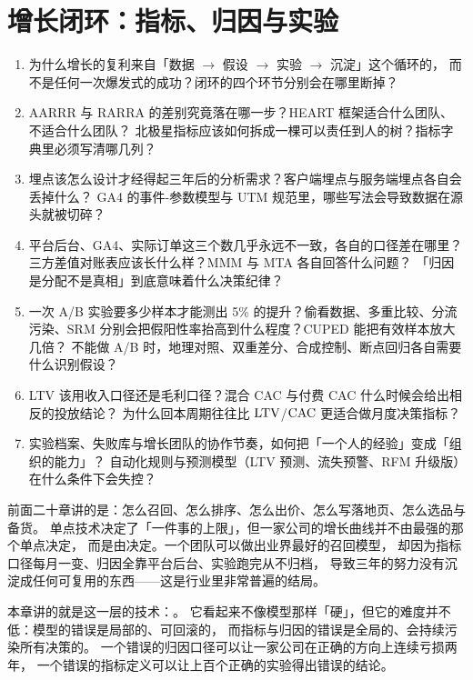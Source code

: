 \chapter{增长闭环：指标、归因与实验}
\label{ch:growth}

\begin{insight}[本章要解决的问题]
\begin{enumerate}
  \item 为什么增长的复利来自「数据 $\to$ 假设 $\to$ 实验 $\to$ 沉淀」这个循环的，
        而不是任何一次爆发式的成功？闭环的四个环节分别会在哪里断掉？
  \item AARRR 与 RARRA 的差别究竟落在哪一步？HEART 框架适合什么团队、不适合什么团队？
        北极星指标应该如何拆成一棵可以责任到人的树？指标字典里必须写清哪几列？
  \item 埋点该怎么设计才经得起三年后的分析需求？客户端埋点与服务端埋点各自会丢掉什么？
        GA4 的事件-参数模型与 UTM 规范里，哪些写法会导致数据在源头就被切碎？
  \item 平台后台、GA4、实际订单这三个数几乎永远不一致，各自的口径差在哪里？
        三方差值对账表应该长什么样？MMM 与 MTA 各自回答什么问题？
        「归因是分配不是真相」到底意味着什么决策纪律？
  \item 一次 A/B 实验要多少样本才能测出 5\% 的提升？偷看数据、多重比较、分流污染、SRM
        分别会把假阳性率抬高到什么程度？CUPED 能把有效样本放大几倍？
        不能做 A/B 时，地理对照、双重差分、合成控制、断点回归各自需要什么识别假设？
  \item LTV 该用收入口径还是毛利口径？混合 CAC 与付费 CAC 什么时候会给出相反的投放结论？
        为什么回本周期往往比 $\operatorname{LTV}$/$\operatorname{CAC}$ 更适合做月度决策指标？
  \item 实验档案、失败库与增长团队的协作节奏，如何把「一个人的经验」变成「组织的能力」？
        自动化规则与预测模型（LTV 预测、流失预警、RFM 升级版）在什么条件下会失控？
\end{enumerate}
\end{insight}

前面二十章讲的是：怎么召回、怎么排序、怎么出价、怎么写落地页、怎么选品与备货。
单点技术决定了「一件事的上限」，但一家公司的增长曲线并不由最强的那个单点决定，
而是由决定。一个团队可以做出业界最好的召回模型，
却因为指标口径每月一变、归因全靠平台后台、实验跑完从不归档，
导致三年的努力没有沉淀成任何可复用的东西——这是行业里非常普遍的结局。

本章讲的就是这一层的技术：。
它看起来不像模型那样「硬」，但它的难度并不低：模型的错误是局部的、可回滚的，
而指标与归因的错误是全局的、会持续污染所有决策的。
一个错误的归因口径可以让一家公司在正确的方向上连续亏损两年，
一个错误的指标定义可以让上百个正确的实验得出错误的结论。

